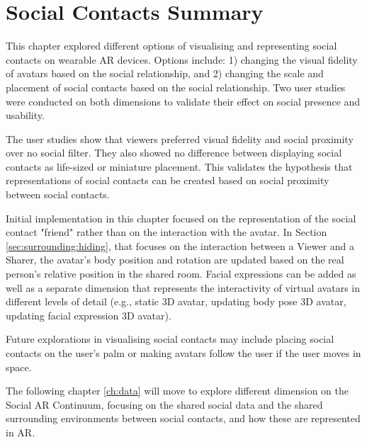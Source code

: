 \pagebreak
\section{Social Contacts Summary}

This chapter explored different options of visualising and representing social contacts on wearable AR devices. Options include: 1) changing the visual fidelity of avatars based on the social relationship, and 2) changing the scale and placement of social contacts based on the social relationship. Two user studies were conducted on both dimensions to validate their effect on social presence and usability. 

The user studies show that viewers preferred visual fidelity and social proximity over no social filter. They also showed no difference between displaying social contacts as life-sized or miniature placement. This validates the hypothesis that representations of social contacts can be created based on social proximity between social contacts. 

Initial implementation in this chapter focused on the representation of the social contact "friend" rather than on the interaction with the avatar. In Section \ref{sec:surrounding:hiding}, that focuses on the interaction between a Viewer and a Sharer, the avatar's body position and rotation are updated based on the real person's relative position in the shared room. Facial expressions can be added as well as a separate dimension that represents the interactivity of virtual avatars in different levels of detail (e.g., static 3D avatar, updating body pose 3D avatar, updating facial expression 3D avatar).

Future explorations in visualising social contacts may include placing social contacts on the user's palm or making avatars follow the user if the user moves in space. 

The following chapter \ref{ch:data} will move to explore different dimension on the Social AR Continuum, focusing on the shared social data and the shared surrounding environments between social contacts, and how these are represented in AR. 


